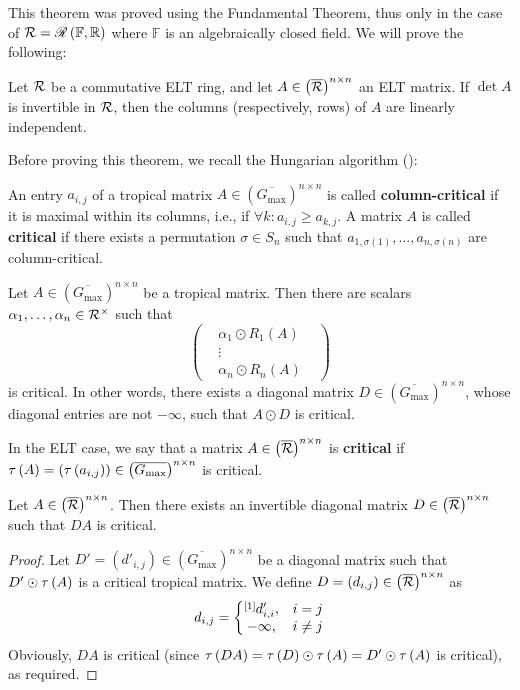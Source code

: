This theorem was proved using the Fundamental Theorem, thus only in the case of $\R=\ELT{\RR}{\mathbb{F}}$ where $\mathbb{F}$ is an algebraically closed field. We will prove the following:

\begin{thm}\label{thm:det-is-invertible}
Let $\R$ be a commutative ELT ring, and let $A\in\left(\overline{\R}\right)^{n\times n}$ an ELT matrix. If $\det A$ is invertible in $\R$, then the columns (respectively, rows) of $A$ are linearly independent.
\end{thm}

Before proving this theorem, we recall the Hungarian algorithm (\cite{K}):
\begin{defn}
An entry $a_{i,j}$ of a tropical matrix $A\in\left(\overline{G_{\max}}\right)^{n\times n}$ is called \textbf{column-critical} if it is maximal within its columns, i.e., if $\forall k:a_{i,j}\ge a_{k,j}$. A matrix $A$ is called \textbf{critical} if there exists a permutation $\sigma\in S_n$ such that $a_{1,\sigma\left(1\right)},\dots,a_{n,\sigma\left(n\right)}$ are column-critical.
\end{defn}

\begin{thm}
Let $A\in\left(\overline{G_{\max}}\right)^{n\times n}$ be a tropical matrix. Then there are scalars $\alpha_1,\dots,\alpha_n\in\R^{\times}$ such that
$$\left(\begin{matrix}&\alpha_1\odot R_1\left(A\right)&\\&\vdots&\\&\alpha_n\odot R_n\left(A\right)&\end{matrix}\right)$$
is critical. In other words, there exists a diagonal matrix $D\in\left(\overline{G_{\max}}\right)^{n\times n}$, whose diagonal entries are not $-\infty$, such that $A\odot D$ is critical.
\end{thm}

In the ELT case, we say that a matrix $A\in\left(\overline{\R}\right)^{n\times n}$ is \textbf{critical} if $\t\left(A\right)=\left(\t\left(a_{i,j}\right)\right)\in\left(\overline{G_{\max}}\right)^{n\times n}$ is critical.

\begin{cor}\label{cor:hung-alg-for-ELT}
Let $A\in\left(\overline{\R}\right)^{n\times n}$. Then there exists an invertible diagonal matrix $D\in\left(\overline{\R}\right)^{n\times n}$ such that $DA$ is critical.
\end{cor}
\begin{proof}
Let $D'=\left(d'_{i,j}\right)\in\left(\overline{G_{\max}}\right)^{n\times n}$ be a diagonal matrix such that $D'\odot\t\left(A\right)$ is a critical tropical matrix. We define $D=\left(d_{i,j}\right)\in\left(\overline{\R}\right)^{n\times n}$ as
$$d_{i,j}=\left\{\begin{matrix}\layer{d'_{i,i}}{1},&i=j\\-\infty,&i\neq j\end{matrix}\right.$$
Obviously, $DA$ is critical (since $\t\left(DA\right)=\t\left(D\right)\odot\t\left(A\right)=D'\odot\t\left(A\right)$ is critical), as required.
\end{proof}

